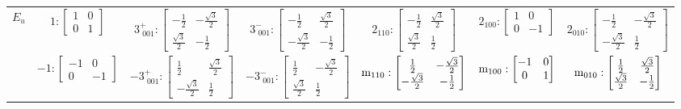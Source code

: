 \documentclass[fleqn,8pt,landscape]{jsarticle}
\begin{document}
\begin{longtable}{ccccccc}
$ E_{u} $ & $ 1:\begin{bmatrix} 1 & 0 \\ 0 & 1 \end{bmatrix} $ & $ 3^{+}_{\,\,001}:\begin{bmatrix} - \frac{1}{2} & - \frac{\sqrt{3}}{2} \\ \frac{\sqrt{3}}{2} & - \frac{1}{2} \end{bmatrix} $ & $ 3^{-}_{\,\,001}:\begin{bmatrix} - \frac{1}{2} & \frac{\sqrt{3}}{2} \\ - \frac{\sqrt{3}}{2} & - \frac{1}{2} \end{bmatrix} $ & $ 2{}_{110}:\begin{bmatrix} - \frac{1}{2} & \frac{\sqrt{3}}{2} \\ \frac{\sqrt{3}}{2} & \frac{1}{2} \end{bmatrix} $ & $ 2{}_{100}:\begin{bmatrix} 1 & 0 \\ 0 & -1 \end{bmatrix} $ & $ 2{}_{010}:\begin{bmatrix} - \frac{1}{2} & - \frac{\sqrt{3}}{2} \\ - \frac{\sqrt{3}}{2} & \frac{1}{2} \end{bmatrix} $ \\
& $ -1:\begin{bmatrix} -1 & 0 \\ 0 & -1 \end{bmatrix} $ & $ -3^{+}_{\,\,001}:\begin{bmatrix} \frac{1}{2} & \frac{\sqrt{3}}{2} \\ - \frac{\sqrt{3}}{2} & \frac{1}{2} \end{bmatrix} $ & $ -3^{-}_{\,\,001}:\begin{bmatrix} \frac{1}{2} & - \frac{\sqrt{3}}{2} \\ \frac{\sqrt{3}}{2} & \frac{1}{2} \end{bmatrix} $ & $ {\rm m}_{110}:\begin{bmatrix} \frac{1}{2} & - \frac{\sqrt{3}}{2} \\ - \frac{\sqrt{3}}{2} & - \frac{1}{2} \end{bmatrix} $ & $ {\rm m}_{100}:\begin{bmatrix} -1 & 0 \\ 0 & 1 \end{bmatrix} $ & $ {\rm m}_{010}:\begin{bmatrix} \frac{1}{2} & \frac{\sqrt{3}}{2} \\ \frac{\sqrt{3}}{2} & - \frac{1}{2} \end{bmatrix} $ \\
\end{longtable}
\end{document}
